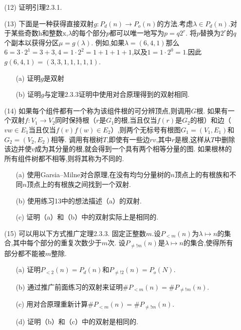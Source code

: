 \documentclass{ctexbook}
\begin{document}
\begin{enumerate}
	\item[(12)]  证明引理2.3.1. 
\end{enumerate}


\begin{enumerate}
	\item[(13)]下面是一种获得直接双射$g:P_d(n)\to P_o(n)$的方法.考虑$\lambda\in P_d(n)$.对于某些奇数h和整数x,$\lambda$的每个部分$p$都可以唯一地写为$p=q2^r$. 将$p$替换为$2^r$的$q$个副本以获得分区$\mu=g(\lambda)$. 例如,如果$\lambda=(6,4,1)$那么$6=3\cdot 2^1=3+3,4=1\cdot 2^2=1+1+1+1$,以及$1=1\cdot2^0=1.$因此$g(6,4,1)=(3,3,1,1,1,1,1)$.	
	\begin{enumerate}
		\item[(a)] 证明$g$是双射
		\item[(b)] 证明$g$与定理2.3.3证明中使用对合原理得到的双射相同. 
	\end{enumerate}
\end{enumerate}


\begin{enumerate}
	\item[(14)]如果每个组件都有一个称为该组件根的可分辨顶点,则调用$G$根. 如果有一个双射$f:V_1\to V_2$同时保持根（$r$是$G_1$的根,当且仅当$f(r)$是$G_2$的根）和边（$vw\in E_1$当且仅当$f(v)f(w)\in E_2$）,则两个无标号有根图$G_1=(V_1,E_1)$和$G_2=(V_2,E_2)$相等. 调用有根树$T$,即使有一些边$rv$,其中$r$是根,这样从$T$中删除该边并使$v$成为其分量的根,就会得到一个具有两个相等分量的图. 如果根林的所有组件树都不相等,则将其称为不同的. 
	\begin{enumerate}
		\item[(a)] 使用Garsia–Milne对合原理,在没有均匀分量树的$n$顶点上的有根族和不同$n$顶点上的有根族之间找到一个双射. 
		\item[(b)] 使用练习13中的想法描述（a）的双射. 
		\item[(c)] 证明（a）和（b）中的双射实际上是相同的. 
	\end{enumerate}
\end{enumerate}

\begin{enumerate}
	\item[(15)]可以用以下方式推广定理2.3.3. 固定正整数$m$.设$P_{<m}(n)$为$\lambda \mapsto n $的集合,其中每个部分的重复次数少于$m$次. 设$P_{\neq !m}(n)$是$\lambda \mapsto n $的集合,使得所有部分都不能被$m$整除.
	\begin{enumerate}
		\item[(a)] 证明$P_{<2}(n)=P_{d}(n)$和$P_{\neq !2}(n)=P_o(N)$.
		\item[(b)] 通过推广前面练习的双射来证明$\#P_{<m}(n)=\#P_{\neq !m}(n)$. 
		\item[(c)] 用对合原理重新计算$\#P_{<m}(n)=\#P_{\neq !m}(n)$. 
		\item[(d)] 证明（b）和（c）中的双射是相同的. 
	\end{enumerate}
\end{enumerate}
\end{document}
